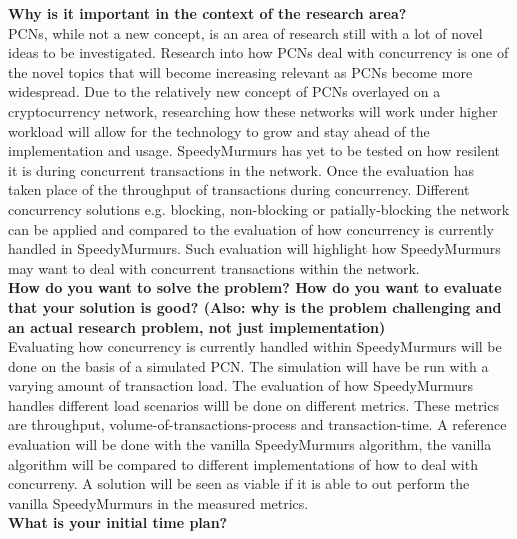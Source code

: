 \documentclass{article}
\newcounter{mn}
\newcommand{\superscript}[1]{\ensuremath{{}^{\textrm{\scriptsize #1}}}}
\newcommand{\mntext}[1]{\colorbox{pink}{\begin{color}{black}#1\end{color}}}
\newcommand{\mn}[2][]{{\tiny\superscript{\mntext{\arabic{mn}}}}\marginpar{\scriptsize{
  \ifthenelse{\isempty{#1}}
  {\mntext{\parbox{0.95\marginparwidth}{\superscript{\arabic{mn}} \raggedright{#2}}}}
  {\mntext{\parbox{0.95\marginparwidth}{\superscript{\arabic{mn}}#1 says: \raggedright{#2}}}}
}}\stepcounter{mn}}
\begin{document}
\textbf{Why is it important in the context of the research area?} \\


PCNs, while not a new concept, is an area of research still with a lot of novel ideas to be investigated. Research into how PCNs deal with concurrency is one of the novel topics that will become increasing relevant as PCNs become more widespread. Due to the relatively new concept of PCNs overlayed on a cryptocurrency network, researching how these networks will work under higher workload will allow for the technology to grow and stay ahead of the implementation and usage. SpeedyMurmurs has yet to be tested on how resilent it is during concurrent transactions in the network. Once the evaluation has taken place of the throughput of transactions during concurrency. Different concurrency solutions e.g. blocking, non-blocking or patially-blocking the network can be applied and compared to the evaluation of how concurrency is currently handled in SpeedyMurmurs. Such evaluation will highlight how SpeedyMurmurs may want to deal with concurrent transactions within the network. \\




\textbf{How do you want to solve the problem? How do you want to evaluate that your solution is good? (Also: why is the problem challenging and an actual research problem, not just implementation)}\\

Evaluating how concurrency is currently handled within SpeedyMurmurs will be done on the basis of a simulated PCN. The simulation will have be run with a varying amount of transaction load. The evaluation of how SpeedyMurmurs handles different load scenarios willl be done on different metrics. These metrics are throughput, volume-of-transactions-process and transaction-time. A reference evaluation will be done with the vanilla SpeedyMurmurs algorithm, the vanilla algorithm will be compared to different implementations of how to deal with concurreny. A solution will be seen as viable if it is able to out perform the vanilla SpeedyMurmurs in the measured metrics. \\

\textbf{What is your initial time plan?} \\


\pagebreak



\end{document}
